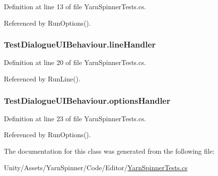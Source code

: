 Definition at line 13 of file Yarn\-Spinner\-Tests.\-cs.



Referenced by Run\-Options().

\hypertarget{a00173_af87332992e1420a8b2047822fab2b03c}{
\subsubsection[{line\-Handler}]{ Test\-Dialogue\-U\-I\-Behaviour.\-line\-Handler}}\label{a00173_af87332992e1420a8b2047822fab2b03c}


Definition at line 20 of file Yarn\-Spinner\-Tests.\-cs.



Referenced by Run\-Line().

\hypertarget{a00173_adcbea72eb6f5ab305b3757789919f961}{
\subsubsection[{options\-Handler}]{ Test\-Dialogue\-U\-I\-Behaviour.\-options\-Handler}}\label{a00173_adcbea72eb6f5ab305b3757789919f961}


Definition at line 23 of file Yarn\-Spinner\-Tests.\-cs.



Referenced by Run\-Options().



The documentation for this class was generated from the following file\-:\begin{DoxyCompactItemize}
\item 
Unity/\-Assets/\-Yarn\-Spinner/\-Code/\-Editor/\hyperlink{a00297}{Yarn\-Spinner\-Tests.\-cs}\end{DoxyCompactItemize}
